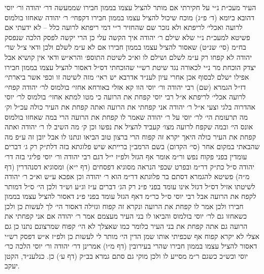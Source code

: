 \documentclass[12pt, openany]{book}
\begin{document}
\begin{multicols}{2}
העיר מעכ״ת נ״י על חקירתי אם מותר להציל עצמו בממון חבירו שממעשה דר׳ יהודה ור׳ יוסי דהובא ביומא (ד׳ פ״ג) מוכח שיכול להציל עצמו בממון חבירו דקפחי׳ ר׳ יהודה שאחזו בולמוס לרועה ואכלי׳ לריפתא ולא נזכר שם שהחזיר ר״י דמי ריפתא לרועה כלל – לא ידעתי אם פשיטא למעכ״ת נ״י שלא שילם ר׳ יהודה איך הקשה עלי כן הרי יקשה לפסק הלכה שנפסק בח״מ (סי׳ שנ״ט) שאסור להציל עצמו בממון חבירו אם לא ע״מ לשלם ולכן ודאי צ״ל שר׳ יהודה לא קפחו רק ע״מ לשלם ושילם לו וא״כ לשיטת התוספ׳ והרא״ש ודאי אין קושיא אבל יצדק הוכחת מר נ״י לכאורה נגד שיטת רש״י שהוכחתי דס״ל דאסור להציל עצמו בממון חבירו אפילו ישלם לבסוף אכן אחרי עיון לענ״ד אדרבא יש ראי׳ מזה לשיטה זו וכפי אשר ביארתי׳ דז״ל הגמרא (שם) רבי יהודה ור׳ יוסי הוו קא אזלי באורחא אחזי׳ בולמוס לר׳ יהודה קפחי׳ לרועה אכלי׳ לריפתא א״ל רבי יוסי קפחת את הרועה כי מטו למתא אחזי׳ בולמוס לר׳ יוסי אהדרוה בלגי וצעי א״ל ר׳ יהודה אני קפחתי את הרועה ואתה קפחת את העיר כולה עכ״ל וק׳ מה תרעומת הי׳ לר׳ יוסי על ר׳ יהודה שאמר לו קפחת את הרועה הרי במה שאחזו בולמוס אונס הי׳ ובמה שקפח לרועה מצו׳ קעביד להציל את נפשו וכן ק׳ מה השיב לו ר׳ יהודה ואתה קפחת את העיר כולה היאך יקרא זה קפוח הרי ברצון טוב הביאו ונתנו לו אבל יובן זה ע״פ מה שהבאתי במקום אחר (סי׳ הקדום) בשם הרמב״ן ברייתא שיש פלוגתא בזה דלת״ק רק ג׳ דברים עומדין בפני פקוח נפש ור״מ אומר אף הגזל ולפ״ז י״ל דגם רבי יהודה ור׳ יוסי פליגי בזה דר׳ יהודה ס״ל כת״ק דר״מ ובפרט שכפי הנראה מסוגיא דפסחים (דף י״א) ומסוגיא דסנהדרין (דף מ״ה) פשיטא להגמרא דסתם בר פלוגתא דר״מ הוא ר׳ יהודה וכן אפכא ע״ש וא״כ ר׳ יהודה לשיטתו אזיל דס״ל דגזל אינו עומד בפני פ״נ רק הג׳ דברים ע״ז וג״ע וש״ד ולכן הי׳ ס״ל דמותר לקפח את הרועה אבל רבי יוסי ס״ל כר״מ דאף הגזל עומד בפני פ״נ דאסור להציל עצמו בממון חבירו ולכן אמר לו קפחת את הרועה ונקרא זה קפוח וגזילה דאסור הי׳ לך לעשות כן ולכן כשאחזו גם לר׳ יוסי בולמוס והביאו לו בני העיר מעצמם אמר ר׳ יהודה אם אני קפחתי את הרועה גם אתה קפחת את בני העיר כלומר כמו שאצלך לא הי׳ קפוח שמרצונם נתנו כן גם אצלי לא יקרא קפוח אף שכפיתי אותו שמן הדין הי׳ מותר לי לעשות כן ולפ״ז א״ש דפסק רש״י דאסור להציל עצמו בממון חבירו שהרי בעירובין (דף מ״ו) אמרינן דר׳ יהודה ור׳ יוסי הלכה כר׳ יוסי וכש״כ כשגם ר״מ מסייע לו ולכן מוקי גם סתם גמרא בב״ק (דף ע׳) כן. כנלענ״ד, הקטן יעקב.\\\vspace{0pt}

\end{multicols}\newpage
\end{document}
